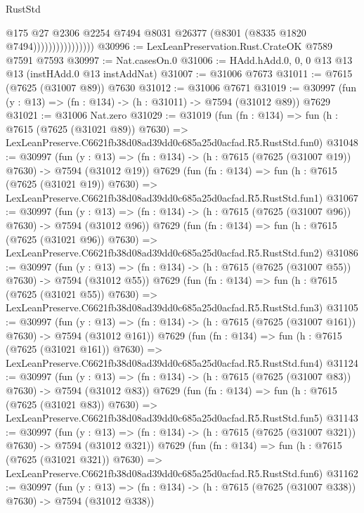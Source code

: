 \begin{lexlean}{RustStd}
\begin{coremodule}
                                @175
                                @27
                                @2306
                                @2254
                                @7494
                                @8031
                                @26377
                                (@8301 (@8335 @1820 @7494))))))))))))))))
@30996 := LexLeanPreservation.Rust.CrateOK @7589 @7591 @7593
@30997 := Nat.casesOn.{0}
@31006 := HAdd.hAdd.{0, 0, 0} @13 @13 @13 (instHAdd.{0} @13 instAddNat)
@31007 := @31006 @7673
@31011 := @7615 (@7625 (@31007 @89)) @7630
@31012 := @31006 @7671
@31019 := @30997 (fun (y : @13) => (fn : @134) -> (h : @31011) -> @7594 (@31012 @89)) @7629
@31021 := @31006 Nat.zero
@31029 := @31019
    (fun (fn : @134) =>
    fun (h : @7615 (@7625 (@31021 @89)) @7630) =>
    LexLeanPreserve.C6621fb38d08ad39dd0c685a25d0acfad.R5.RustStd.fun0)
@31048 := @30997
    (fun (y : @13) => (fn : @134) -> (h : @7615 (@7625 (@31007 @19)) @7630) -> @7594 (@31012 @19))
    @7629
    (fun (fn : @134) =>
    fun (h : @7615 (@7625 (@31021 @19)) @7630) =>
    LexLeanPreserve.C6621fb38d08ad39dd0c685a25d0acfad.R5.RustStd.fun1)
@31067 := @30997
    (fun (y : @13) => (fn : @134) -> (h : @7615 (@7625 (@31007 @96)) @7630) -> @7594 (@31012 @96))
    @7629
    (fun (fn : @134) =>
    fun (h : @7615 (@7625 (@31021 @96)) @7630) =>
    LexLeanPreserve.C6621fb38d08ad39dd0c685a25d0acfad.R5.RustStd.fun2)
@31086 := @30997
    (fun (y : @13) => (fn : @134) -> (h : @7615 (@7625 (@31007 @55)) @7630) -> @7594 (@31012 @55))
    @7629
    (fun (fn : @134) =>
    fun (h : @7615 (@7625 (@31021 @55)) @7630) =>
    LexLeanPreserve.C6621fb38d08ad39dd0c685a25d0acfad.R5.RustStd.fun3)
@31105 := @30997
    (fun (y : @13) => (fn : @134) -> (h : @7615 (@7625 (@31007 @161)) @7630) -> @7594 (@31012 @161))
    @7629
    (fun (fn : @134) =>
    fun (h : @7615 (@7625 (@31021 @161)) @7630) =>
    LexLeanPreserve.C6621fb38d08ad39dd0c685a25d0acfad.R5.RustStd.fun4)
@31124 := @30997
    (fun (y : @13) => (fn : @134) -> (h : @7615 (@7625 (@31007 @83)) @7630) -> @7594 (@31012 @83))
    @7629
    (fun (fn : @134) =>
    fun (h : @7615 (@7625 (@31021 @83)) @7630) =>
    LexLeanPreserve.C6621fb38d08ad39dd0c685a25d0acfad.R5.RustStd.fun5)
@31143 := @30997
    (fun (y : @13) => (fn : @134) -> (h : @7615 (@7625 (@31007 @321)) @7630) -> @7594 (@31012 @321))
    @7629
    (fun (fn : @134) =>
    fun (h : @7615 (@7625 (@31021 @321)) @7630) =>
    LexLeanPreserve.C6621fb38d08ad39dd0c685a25d0acfad.R5.RustStd.fun6)
@31162 := @30997
    (fun (y : @13) => (fn : @134) -> (h : @7615 (@7625 (@31007 @338)) @7630) -> @7594 (@31012 @338))

\end{coremodule}
\end{lexlean}

